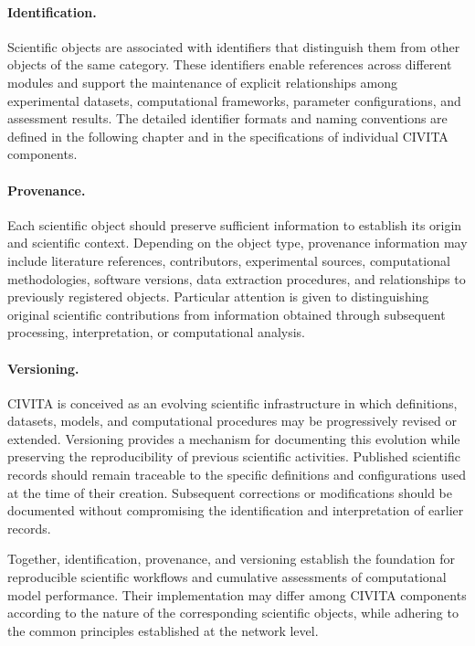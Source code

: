 \paragraph{Identification.}
Scientific objects are associated with identifiers that distinguish them from other objects of the same category. These identifiers enable references across different modules and support the maintenance of explicit relationships among experimental datasets, computational frameworks, parameter configurations, and assessment results. The detailed identifier formats and naming conventions are defined in the following chapter and in the specifications of individual CIVITA components.

\paragraph{Provenance.}
Each scientific object should preserve sufficient information to establish its origin and scientific context. Depending on the object type, provenance information may include literature references, contributors, experimental sources, computational methodologies, software versions, data extraction procedures, and relationships to previously registered objects. Particular attention is given to distinguishing original scientific contributions from information obtained through subsequent processing, interpretation, or computational analysis.

\paragraph{Versioning.}
CIVITA is conceived as an evolving scientific infrastructure in which definitions, datasets, models, and computational procedures may be progressively revised or extended. Versioning provides a mechanism for documenting this evolution while preserving the reproducibility of previous scientific activities. Published scientific records should remain traceable to the specific definitions and configurations used at the time of their creation. Subsequent corrections or modifications should be documented without compromising the identification and interpretation of earlier records.

Together, identification, provenance, and versioning establish the foundation for reproducible scientific workflows and cumulative assessments of computational model performance. Their implementation may differ among CIVITA components according to the nature of the corresponding scientific objects, while adhering to the common principles established at the network level.



